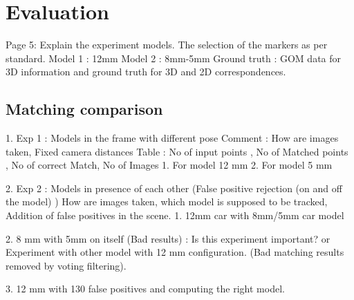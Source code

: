 \documentclass{bmvc2k}
\begin{document}


\section{Evaluation}
Page 5: 
Explain the experiment models. The selection of the markers as per standard. 
Model 1 : 12mm 
Model 2 : 8mm-5mm 
Ground truth : GOM data for 3D information and ground truth for 3D and 2D correspondences. 
\subsection{Matching comparison}
1. Exp 1 : Models in the frame with different pose 
Comment : How are images taken, Fixed camera distances 
Table : No of input points , No of Matched points , No of correct Match, No of Images
1. For model 12 mm 
2. For model 5 mm

2. Exp 2 : Models in presence of each other (False positive rejection (on and off the model) )
How are images taken, which model is supposed to be tracked, Addition of false positives in the scene. 
1. 12mm car with 8mm/5mm car model 

2. 8 mm with 5mm on itself (Bad results) : Is this experiment important? or Experiment with other model with 12 mm configuration. (Bad matching results removed by voting filtering). 

3. 12 mm with 130 false positives and computing the right model. 
\end{document}
